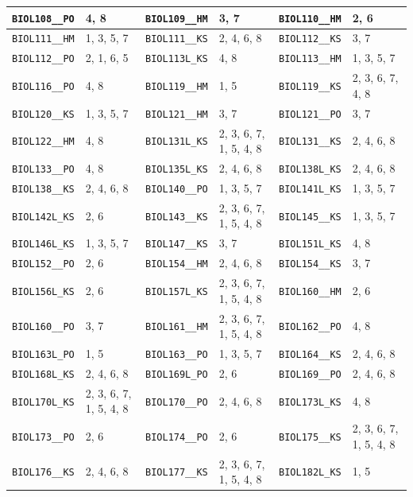 \begin{longtable}{|l|l||l|l||l|l|}
    \verb|BIOL108__PO| & 4, 8 & \verb|BIOL109__HM| & 3, 7 & \verb|BIOL110__HM| & 2, 6\\\hline
    \verb|BIOL111__HM| & 1, 3, 5, 7 & \verb|BIOL111__KS| & 2, 4, 6, 8 & \verb|BIOL112__KS| & 3, 7\\\hline
    \verb|BIOL112__PO| & 2, 1, 6, 5 & \verb|BIOL113L_KS| & 4, 8 & \verb|BIOL113__HM| & 1, 3, 5, 7\\\hline
    \verb|BIOL116__PO| & 4, 8 & \verb|BIOL119__HM| & 1, 5 & \verb|BIOL119__KS| & 2, 3, 6, 7, 4, 8\\\hline
    \verb|BIOL120__KS| & 1, 3, 5, 7 & \verb|BIOL121__HM| & 3, 7 & \verb|BIOL121__PO| & 3, 7\\\hline
    \verb|BIOL122__HM| & 4, 8 & \verb|BIOL131L_KS| & 2, 3, 6, 7, 1, 5, 4, 8 & \verb|BIOL131__KS| & 2, 4, 6, 8\\\hline
    \verb|BIOL133__PO| & 4, 8 & \verb|BIOL135L_KS| & 2, 4, 6, 8 & \verb|BIOL138L_KS| & 2, 4, 6, 8\\\hline
    \verb|BIOL138__KS| & 2, 4, 6, 8 & \verb|BIOL140__PO| & 1, 3, 5, 7 & \verb|BIOL141L_KS| & 1, 3, 5, 7\\\hline
    \verb|BIOL142L_KS| & 2, 6 & \verb|BIOL143__KS| & 2, 3, 6, 7, 1, 5, 4, 8 & \verb|BIOL145__KS| & 1, 3, 5, 7\\\hline
    \verb|BIOL146L_KS| & 1, 3, 5, 7 & \verb|BIOL147__KS| & 3, 7 & \verb|BIOL151L_KS| & 4, 8\\\hline
    \verb|BIOL152__PO| & 2, 6 & \verb|BIOL154__HM| & 2, 4, 6, 8 & \verb|BIOL154__KS| & 3, 7\\\hline
    \verb|BIOL156L_KS| & 2, 6 & \verb|BIOL157L_KS| & 2, 3, 6, 7, 1, 5, 4, 8 & \verb|BIOL160__HM| & 2, 6\\\hline
    \verb|BIOL160__PO| & 3, 7 & \verb|BIOL161__HM| & 2, 3, 6, 7, 1, 5, 4, 8 & \verb|BIOL162__PO| & 4, 8\\\hline
    \verb|BIOL163L_PO| & 1, 5 & \verb|BIOL163__PO| & 1, 3, 5, 7 & \verb|BIOL164__KS| & 2, 4, 6, 8\\\hline
    \verb|BIOL168L_KS| & 2, 4, 6, 8 & \verb|BIOL169L_PO| & 2, 6 & \verb|BIOL169__PO| & 2, 4, 6, 8\\\hline
    \verb|BIOL170L_KS| & 2, 3, 6, 7, 1, 5, 4, 8 & \verb|BIOL170__PO| & 2, 4, 6, 8 & \verb|BIOL173L_KS| & 4, 8\\\hline
    \verb|BIOL173__PO| & 2, 6 & \verb|BIOL174__PO| & 2, 6 & \verb|BIOL175__KS| & 2, 3, 6, 7, 1, 5, 4, 8\\\hline
    \verb|BIOL176__KS| & 2, 4, 6, 8 & \verb|BIOL177__KS| & 2, 3, 6, 7, 1, 5, 4, 8 & \verb|BIOL182L_KS| & 1, 5\\\hline

\end{longtable}
